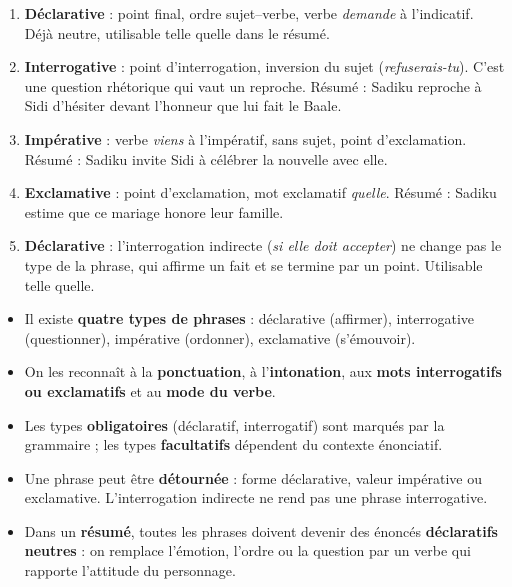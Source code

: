 \documentclass[11pt]{article}
\begin{document}
\begin{corrige}
\begin{enumerate}
\item \textbf{Déclarative} : point final, ordre sujet--verbe, verbe \emph{demande} à l'indicatif. Déjà neutre, utilisable telle quelle dans le résumé.
\item \textbf{Interrogative} : point d'interrogation, inversion du sujet (\emph{refuserais-tu}). C'est une question rhétorique qui vaut un reproche. Résumé : \og Sadiku reproche à Sidi d'hésiter devant l'honneur que lui fait le Baale. \fg
\item \textbf{Impérative} : verbe \emph{viens} à l'impératif, sans sujet, point d'exclamation. Résumé : \og Sadiku invite Sidi à célébrer la nouvelle avec elle. \fg
\item \textbf{Exclamative} : point d'exclamation, mot exclamatif \emph{quelle}. Résumé : \og Sadiku estime que ce mariage honore leur famille. \fg
\item \textbf{Déclarative} : l'interrogation indirecte (\emph{si elle doit accepter}) ne change pas le type de la phrase, qui affirme un fait et se termine par un point. Utilisable telle quelle.
\end{enumerate}
\end{corrige}

\begin{aretenir}[L'essentiel]
\begin{itemize}
\item Il existe \textbf{quatre types de phrases} : déclarative (affirmer), interrogative (questionner), impérative (ordonner), exclamative (s'émouvoir).
\item On les reconnaît à la \textbf{ponctuation}, à l'\textbf{intonation}, aux \textbf{mots interrogatifs ou exclamatifs} et au \textbf{mode du verbe}.
\item Les types \textbf{obligatoires} (déclaratif, interrogatif) sont marqués par la grammaire ; les types \textbf{facultatifs} dépendent du contexte énonciatif.
\item Une phrase peut être \textbf{détournée} : forme déclarative, valeur impérative ou exclamative. L'interrogation indirecte ne rend pas une phrase interrogative.
\item Dans un \textbf{résumé}, toutes les phrases doivent devenir des énoncés \textbf{déclaratifs neutres} : on remplace l'émotion, l'ordre ou la question par un verbe qui rapporte l'attitude du personnage.
\end{itemize}
\end{aretenir}
\end{document}
